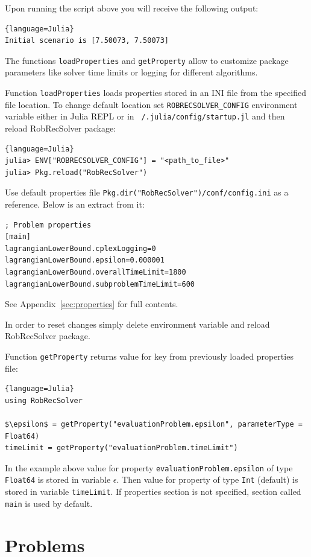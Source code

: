Upon running the script above you will receive the following output:
\begin{lstlisting}{language=Julia}
Initial scenario is [7.50073, 7.50073]
\end{lstlisting}

The functions \texttt{loadProperties} and \texttt{getProperty} allow to customize package parameters like solver time limits or logging for different algorithms.

Function \texttt{loadProperties} loads properties stored in an INI file from the specified file location. To change default location set \texttt{ROBRECSOLVER\_CONFIG} environment variable either in Julia REPL or in \texttt{~/.julia/config/startup.jl} and then reload RobRecSolver package:
\begin{lstlisting}{language=Julia}
julia> ENV["ROBRECSOLVER_CONFIG"] = "<path_to_file>"
julia> Pkg.reload("RobRecSolver")
\end{lstlisting}
Use default properties file \texttt{Pkg.dir("RobRecSolver")/conf/config.ini} as a reference. Below is an extract from it:
\begin{lstlisting}
; Problem properties
[main]
lagrangianLowerBound.cplexLogging=0
lagrangianLowerBound.epsilon=0.000001
lagrangianLowerBound.overallTimeLimit=1800
lagrangianLowerBound.subproblemTimeLimit=600
\end{lstlisting}
See Appendix~\ref{sec:properties} for full contents.

In order to reset changes simply delete environment variable and reload RobRecSolver package.

Function \texttt{getProperty} returns value for key from previously loaded properties file:
\begin{lstlisting}[mathescape]{language=Julia}
using RobRecSolver

$\epsilon$ = getProperty("evaluationProblem.epsilon", parameterType = Float64)
timeLimit = getProperty("evaluationProblem.timeLimit")
\end{lstlisting}
In the example above value for property \texttt{evaluationProblem.epsilon} of type \texttt{Float64} is stored in variable \texttt{$\epsilon$}. Then value for property \texttt{} of type \texttt{Int} (default) is stored in variable \texttt{timeLimit}. If properties section is not specified, section called \texttt{main} is used by default.

\section{Problems}
